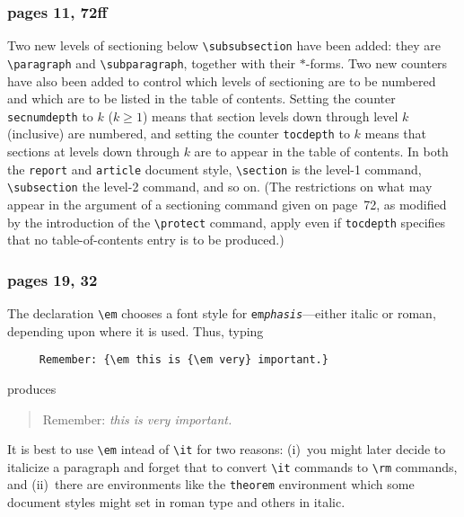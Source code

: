 \subsubsection*{pages 11, 72ff}
Two new levels of sectioning below \hbox{\verb"\subsubsection"} have
been added: they are \hbox{\verb"\paragraph"} and \hbox{\verb"\subparagraph"},
together with their $*$-forms.  Two new counters have also been added
to control which levels of sectioning are to be numbered and which are
to be listed in the table of contents.  Setting the
counter \hbox{\verb"secnumdepth"} to $k$ ($k\ge 1$) means that section
levels down through level $k$ (inclusive) are numbered, and setting
the counter \hbox{\verb"tocdepth"} to $k$ means that sections at
levels down through $k$ are to appear in the table of contents.  In
both the \hbox{\verb"report"} and \hbox{\verb"article"} document
style, \hbox{\verb"\section"} is the level-1 command,
\hbox{\verb"\subsection"} the level-2 command, and so on.  (The
restrictions on what may appear in the argument of a sectioning
command given on page~72, as modified by the introduction of the
\hbox{\verb"\protect"} command, apply even if \hbox{\verb"tocdepth"}
specifies that no table-of-contents entry is to be produced.)

\subsubsection*{pages 19, 32}
The declaration \hbox{\verb"\em"} 
chooses a font style for \mbox{\tt em\it phasis}---either
italic or roman, depending upon where it is used.  Thus, typing
\begin{verbatim}
     Remember: {\em this is {\em very} important.}  
\end{verbatim}
produces
\begin{quote}
Remember: {\em this is {\em very} important.}
\end{quote}
It is best to use \hbox{\verb"\em"} intead of \hbox{\verb"\it"}
for two reasons: (i)~you might later decide to italicize
a paragraph and forget that to convert \hbox{\verb"\it"} commands
to \hbox{\verb"\rm"} commands, and (ii)~there are environments
like the \hbox{\tt theorem} environment which some document styles
might set in roman type and others in italic.

